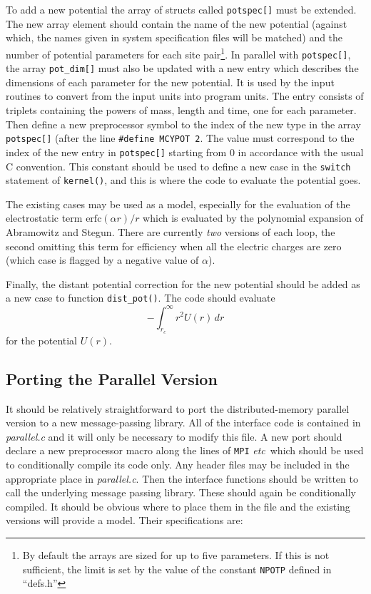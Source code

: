 \documentclass[twoside]{report}
\newcommand{\etc}{{\em etc}}
\newcommand{\erfc}{\mbox{erfc}}
\begin{document}
To add a new potential the array of structs called \texttt{potspec[]}
must be extended.  The new array element should contain the name of
the new potential (against which, the names given in system
specification files will be matched) and the number of potential
parameters for each site pair\footnote{By default the arrays are sized
  for up to five parameters. If this is not sufficient, the limit is
  set by the value of the constant \texttt{NPOTP} defined in
  ``defs.h''}.  In parallel with \texttt{potspec[]}, the array
\texttt{pot\_dim[]} must also be updated with a new entry which
describes the dimensions of each parameter for the new potential. It
is used by the input routines to convert from the input units into
program units.  The entry consists of triplets containing the powers
of mass, length and time, one for each parameter.  Then define a new
preprocessor symbol to the index of the new type in the array
\texttt{potspec[]} (after the line
\texttt{\#define}~\texttt{MCYPOT}~\texttt{2}.  The value must
correspond to the index of the new entry in \texttt{potspec[]}
starting from 0 in accordance with the usual C convention.  This
constant should be used to define a new case in the \texttt{switch}
statement of \texttt{kernel()}, and this is where the code to evaluate
the potential goes.

The  existing  cases  may  be  used as  a    model, especially for the
evaluation of the electrostatic term $\erfc(\alpha r) / r$ which
is    evaluated  by  the   polynomial  expansion    of  Abramowitz and
Stegun\cite[section 7.1.26]{abramowitz:70}. There  are  currently {\em
two\/}   versions of each    loop,  the   second omitting this  term for
efficiency when  all the  electric  charges  are  zero  (which case is
flagged by a negative value of $\alpha$).

Finally, the distant potential correction for the new potential should
be added as a new case to function \texttt{dist\_pot()}. The code
should evaluate
\[
- \int^{\infty}_{r_c} r^2 U(r) \, dr
\]
for the potential $U(r)$.

\subsection{Porting the Parallel Version}
\label{sec:parport}
It should be relatively straightforward to port the distributed-memory
parallel version to a new message-passing library.  All of the
interface code is contained in {\em parallel.c}\/ and it will only be
necessary to modify this file.  A new port should declare a new
preprocessor macro along the lines of \texttt{MPI} \etc\ which should be
used to conditionally compile its code only.  Any header files may be
included in the appropriate place in {\em parallel.c}.  Then the
interface functions should be written to call the underlying message
passing library. These should again be conditionally compiled.  It
should be obvious where to place them in the file and the existing
versions will provide a model.  Their specifications are:
\end{document}
